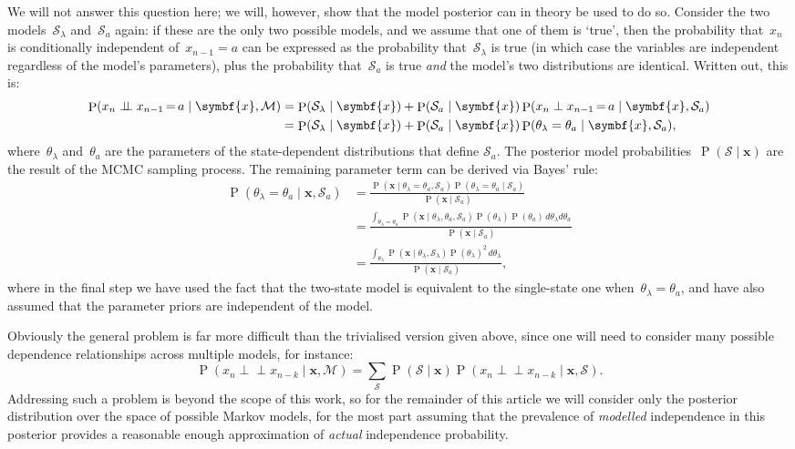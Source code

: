 \documentclass[11pt,a4paper]{article}
\newcommand\mc[1]{\mathcal{#1}}               %
\newcommand\ub[1]{\symbf{#1}}                 %
\DeclareMathOperator\Pb{P}                    %
\DeclarePairedDelimiter\lr{\lparen}{\rparen}  %
\newcommand\ind{\perp\!\!\!\perp}        %
\newcommand\peq{\mathop{=}}              %
\begin{document}
We will not answer this question here; we will, however, show that the model
posterior can in theory be used to do so. Consider the two
models~\(\mc{S}_{\lambda}\) and~\(\mc{S}_a\) again: if these are the only two
possible models, and we assume that one of them is `true', then the probability
that~\(x_n\) is conditionally independent of~\(x_{n-1} = a\) can be expressed as
the probability that~\(\mc{S}_{\lambda}\) is true (in which case the variables
are independent regardless of the model's parameters), plus the probability
that~\(\mc{S}_a\) is true \emph{and} the model's two distributions are
identical. Written out, this is:
\begin{align*}
  \Pb(x_n \ind x_{n-1} \peq a \mid \ub{x}, \mc{M}) &=
    \Pb(\mc{S}_{\lambda} \mid \ub{x}) + \Pb(\mc{S}_a \mid \ub{x})
    \Pb(x_n \perp x_{n-1} \peq a \mid \ub{x}, \mc{S}_a) \\
  &= \Pb(\mc{S}_{\lambda} \mid \ub{x}) + \Pb(\mc{S}_a \mid \ub{x})
    \Pb\lr*{\theta_{\lambda} = \theta_a \mid \ub{x}, \mc{S}_a},
\end{align*}
where~\(\theta_{\lambda}\) and~\(\theta_a\) are the parameters of the
state-dependent distributions that define \(\mc{S}_a\). The posterior model
probabilities~\(\Pb(\mc{S} \mid \ub{x})\) are the result of the MCMC sampling
process. The remaining parameter term can be derived via Bayes' rule:
\begin{align*}
  \Pb(\theta_{\lambda} = \theta_a \mid \ub{x}, \mc{S}_a) &=
    \frac{\Pb(\ub{x} \mid \theta_{\lambda} = \theta_a, \mc{S}_a)
    \Pb(\theta_{\lambda} = \theta_a \mid \mc{S}_a)}
    {\Pb(\ub{x} \mid \mc{S}_a)} \\
  &= \frac{\int_{\theta_{\lambda}=\theta_a}
    \Pb(\ub{x} \mid \theta_{\lambda}, \theta_a, \mc{S}_a) \Pb(\theta_{\lambda})
    \Pb(\theta_a)\, d\theta_{\lambda} d\theta_a}{\Pb(\ub{x} \mid \mc{S}_a)} \\
  &= \frac{\int_{\theta_{\lambda}}
    \Pb(\ub{x} \mid \theta_{\lambda}, \mc{S}_{\lambda})
    \Pb(\theta_{\lambda})^2\, d\theta_{\lambda}}{\Pb(\ub{x} \mid \mc{S}_a)},
\end{align*}
where in the final step we have used the fact that the two-state model is
equivalent to the single-state one when~\(\theta_{\lambda} = \theta_a\), and
have also assumed that the parameter priors are independent of the model.

Obviously the general problem is far more difficult than the trivialised version
given above, since one will need to consider many possible dependence
relationships across multiple models, for instance:
\begin{equation*}
  \Pb(x_n \ind x_{n-k} \mid \ub{x}, \mc{M}) =
    \sum_{\mc{S}} \Pb(\mc{S} \mid \ub{x})
    \Pb(x_n \ind x_{n-k} \mid \ub{x}, \mc{S}).
\end{equation*}
Addressing such a problem is beyond the scope of this work, so for the remainder
of this article we will consider only the posterior distribution over the space
of possible Markov models, for the most part assuming that the prevalence of
\emph{modelled} independence in this posterior provides a reasonable enough
approximation of \emph{actual} independence probability.
\end{document}
